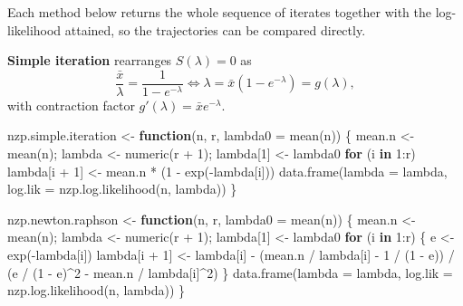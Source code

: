 \documentclass[
  letterpaper,
  DIV=11,
  numbers=noendperiod]{scrreprt}
\newenvironment{Shaded}{\begin{snugshade}}{\end{snugshade}}
\newcommand{\AttributeTok}[1]{\textcolor[rgb]{0.40,0.45,0.13}{#1}}
\newcommand{\ControlFlowTok}[1]{\textcolor[rgb]{0.00,0.23,0.31}{\textbf{#1}}}
\newcommand{\DecValTok}[1]{\textcolor[rgb]{0.68,0.00,0.00}{#1}}
\newcommand{\FunctionTok}[1]{\textcolor[rgb]{0.28,0.35,0.67}{#1}}
\newcommand{\NormalTok}[1]{\textcolor[rgb]{0.00,0.23,0.31}{#1}}
\newcommand{\OtherTok}[1]{\textcolor[rgb]{0.00,0.23,0.31}{#1}}
\newcommand{\SpecialCharTok}[1]{\textcolor[rgb]{0.37,0.37,0.37}{#1}}
\begin{document}
Each method below returns the whole sequence of iterates together with
the log-likelihood attained, so the trajectories can be compared
directly.

\textbf{Simple iteration} rearranges \(S(\lambda) = 0\) as
\[\frac{\bar x}{\lambda} = \frac{1}{1 - e^{-\lambda}} \iff \lambda = \bar x\left(1 - e^{-\lambda}\right) = g(\lambda),\]
with contraction factor \(g'(\lambda) = \bar x e^{-\lambda}\).

\begin{Shaded}
\begin{Highlighting}[]
\NormalTok{nzp.simple.iteration }\OtherTok{\textless{}{-}} \ControlFlowTok{function}\NormalTok{(n, r, }\AttributeTok{lambda0 =} \FunctionTok{mean}\NormalTok{(n)) \{}
\NormalTok{  mean.n }\OtherTok{\textless{}{-}} \FunctionTok{mean}\NormalTok{(n); lambda }\OtherTok{\textless{}{-}} \FunctionTok{numeric}\NormalTok{(r }\SpecialCharTok{+} \DecValTok{1}\NormalTok{); lambda[}\DecValTok{1}\NormalTok{] }\OtherTok{\textless{}{-}}\NormalTok{ lambda0}
  \ControlFlowTok{for}\NormalTok{ (i }\ControlFlowTok{in} \DecValTok{1}\SpecialCharTok{:}\NormalTok{r) lambda[i }\SpecialCharTok{+} \DecValTok{1}\NormalTok{] }\OtherTok{\textless{}{-}}\NormalTok{ mean.n }\SpecialCharTok{*}\NormalTok{ (}\DecValTok{1} \SpecialCharTok{{-}} \FunctionTok{exp}\NormalTok{(}\SpecialCharTok{{-}}\NormalTok{lambda[i]))}
  \FunctionTok{data.frame}\NormalTok{(}\AttributeTok{lambda =}\NormalTok{ lambda, }\AttributeTok{log.lik =} \FunctionTok{nzp.log.likelihood}\NormalTok{(n, lambda))}
\NormalTok{\}}

\NormalTok{nzp.newton.raphson }\OtherTok{\textless{}{-}} \ControlFlowTok{function}\NormalTok{(n, r, }\AttributeTok{lambda0 =} \FunctionTok{mean}\NormalTok{(n)) \{}
\NormalTok{  mean.n }\OtherTok{\textless{}{-}} \FunctionTok{mean}\NormalTok{(n); lambda }\OtherTok{\textless{}{-}} \FunctionTok{numeric}\NormalTok{(r }\SpecialCharTok{+} \DecValTok{1}\NormalTok{); lambda[}\DecValTok{1}\NormalTok{] }\OtherTok{\textless{}{-}}\NormalTok{ lambda0}
  \ControlFlowTok{for}\NormalTok{ (i }\ControlFlowTok{in} \DecValTok{1}\SpecialCharTok{:}\NormalTok{r) \{}
\NormalTok{    e }\OtherTok{\textless{}{-}} \FunctionTok{exp}\NormalTok{(}\SpecialCharTok{{-}}\NormalTok{lambda[i])}
\NormalTok{    lambda[i }\SpecialCharTok{+} \DecValTok{1}\NormalTok{] }\OtherTok{\textless{}{-}}\NormalTok{ lambda[i] }\SpecialCharTok{{-}}
\NormalTok{      (mean.n }\SpecialCharTok{/}\NormalTok{ lambda[i] }\SpecialCharTok{{-}} \DecValTok{1} \SpecialCharTok{/}\NormalTok{ (}\DecValTok{1} \SpecialCharTok{{-}}\NormalTok{ e)) }\SpecialCharTok{/}\NormalTok{ (e }\SpecialCharTok{/}\NormalTok{ (}\DecValTok{1} \SpecialCharTok{{-}}\NormalTok{ e)}\SpecialCharTok{\^{}}\DecValTok{2} \SpecialCharTok{{-}}\NormalTok{ mean.n }\SpecialCharTok{/}\NormalTok{ lambda[i]}\SpecialCharTok{\^{}}\DecValTok{2}\NormalTok{)}
\NormalTok{  \}}
  \FunctionTok{data.frame}\NormalTok{(}\AttributeTok{lambda =}\NormalTok{ lambda, }\AttributeTok{log.lik =} \FunctionTok{nzp.log.likelihood}\NormalTok{(n, lambda))}
\NormalTok{\}}


\end{Highlighting}
\end{Shaded}
\end{document}
